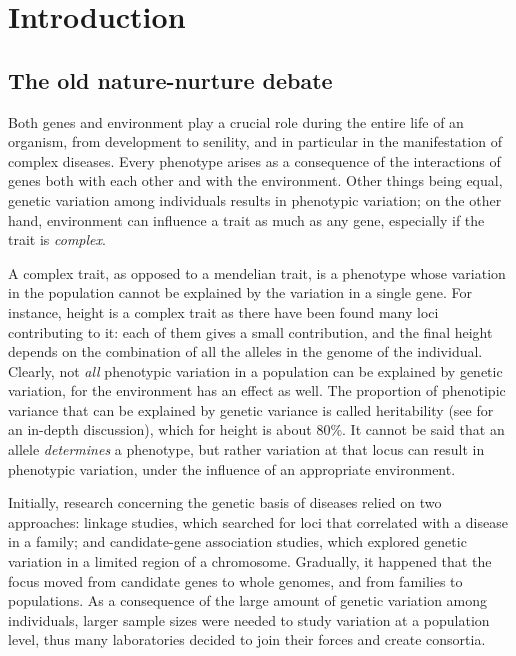 \documentclass[../main.tex]{subfiles}
\begin{document}
\chapter{Introduction}

\section{The old nature-nurture debate}

Both genes and environment play a crucial role during the entire life of 
an organism, from development to senility, and in particular in the 
manifestation of complex diseases. Every phenotype arises as a 
consequence of the interactions of genes both with each other and with 
the environment. Other things being equal, genetic variation among 
individuals results in phenotypic variation; on the other hand, 
environment can influence a trait as much as any gene, especially if the 
trait is \textit{complex}.

A complex trait, as opposed to a mendelian trait, is a phenotype whose 
variation in the population cannot be explained by the variation in a 
single gene. For instance, height is a complex trait as there have been 
found many loci contributing to it: each of them gives a small 
contribution, and the final height depends on the combination of all the 
alleles in the genome of the individual. Clearly, not \textit{all} 
phenotypic variation in a population can be explained by genetic 
variation, for the environment has an effect as well. The proportion of 
phenotipic variance that can be explained by genetic variance is called 
heritability (see  for an in-depth discussion), 
which for height is about 80\%\autocite{Visscher2008a}. It cannot be 
said that an allele \textit{determines} a phenotype, but rather 
variation at that locus can result in phenotypic variation, under the 
influence of an appropriate environment.

Initially, research concerning the genetic basis of diseases relied on 
two approaches: linkage studies, which searched for loci that correlated 
with a disease in a family; and candidate-gene association studies, 
which explored genetic variation in a limited region of a chromosome. 
Gradually, it happened that the focus moved from candidate genes to 
whole genomes, and from families to populations. As a consequence of the 
large amount of genetic variation among individuals, larger sample sizes 
were needed to study variation at a population level, thus many 
laboratories decided to join their forces and create consortia.
\end{document}
